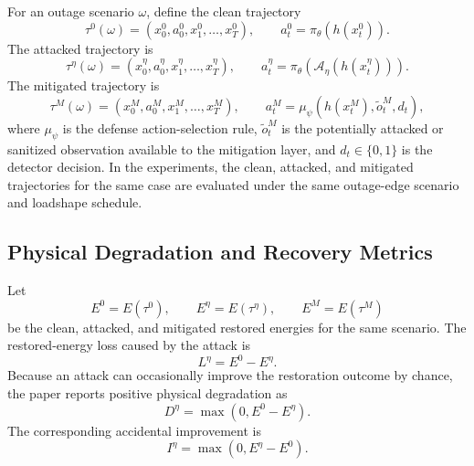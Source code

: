 For an outage scenario $\omega$, define the clean trajectory
\begin{equation}
    \tau^{0}(\omega)
    =
    \left(
        x^{0}_0,a^{0}_0,x^{0}_1,\ldots,x^{0}_T
    \right),
    \qquad
    a^{0}_t = \pi_{\theta}(h(x^{0}_t)).
    \label{eq:clean_trajectory}
\end{equation}
The attacked trajectory is
\begin{equation}
    \tau^{\eta}(\omega)
    =
    \left(
        x^{\eta}_0,a^{\eta}_0,x^{\eta}_1,\ldots,x^{\eta}_T
    \right),
    \qquad
    a^{\eta}_t = \pi_{\theta}(\mathcal{A}_{\eta}(h(x^{\eta}_t))).
    \label{eq:attacked_trajectory}
\end{equation}
The mitigated trajectory is
\begin{equation}
    \tau^{M}(\omega)
    =
    \left(
        x^{M}_0,a^{M}_0,x^{M}_1,\ldots,x^{M}_T
    \right),
    \qquad
    a^{M}_t = \mu_{\psi}(h(x^{M}_t),\tilde{o}^{M}_t,d_t),
    \label{eq:mitigated_trajectory}
\end{equation}
where $\mu_{\psi}$ is the defense action-selection rule, $\tilde{o}^{M}_t$ is the potentially attacked or sanitized observation available to the mitigation layer, and $d_t \in \{0,1\}$ is the detector decision. In the experiments, the clean, attacked, and mitigated trajectories for the same case are evaluated under the same outage-edge scenario and loadshape schedule.

\subsection{Physical Degradation and Recovery Metrics}
\label{subsec:metrics}

Let
\begin{equation}
    E^0 = E(\tau^0), \qquad
    E^{\eta} = E(\tau^{\eta}), \qquad
    E^{M} = E(\tau^{M})
\end{equation}
be the clean, attacked, and mitigated restored energies for the same scenario. The restored-energy loss caused by the attack is
\begin{equation}
    L^{\eta} = E^0 - E^{\eta}.
    \label{eq:loss_raw}
\end{equation}
Because an attack can occasionally improve the restoration outcome by chance, the paper reports positive physical degradation as
\begin{equation}
    D^{\eta}
    =
    \max\left(0, E^0 - E^{\eta}\right).
    \label{eq:physical_degradation}
\end{equation}
The corresponding accidental improvement is
\begin{equation}
    I^{\eta}
    =
    \max\left(0, E^{\eta} - E^0\right).
    \label{eq:accidental_improvement}
\end{equation}

